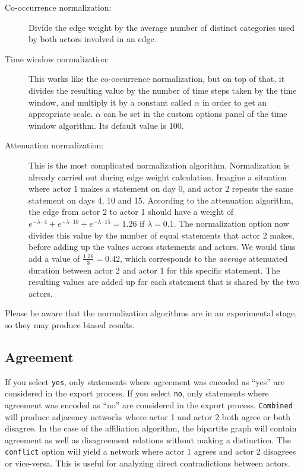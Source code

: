 \documentclass[12pt,a4paper]{scrreprt}
\newcommand{\code}[1]{\texttt{#1}}
\begin{document}
\begin{description}
 \item[Co-occurrence normalization:] Divide the edge weight by the average number of distinct categories used by both actors involved in an edge.
 \item[Time window normalization:] This works like the co-occurrence normalization, but on top of that, it divides the resulting value by the number of time steps taken by the time window, and multiply it by a constant called $\alpha$ in order to get an appropriate scale. $\alpha$ can be set in the custom options panel of the time window algorithm. Its default value is 100.
 \item[Attenuation normalization:] This is the most complicated normalization algorithm. Normalization is already carried out during edge weight calculation. Imagine a situation where actor 1 makes a statement on day 0, and actor 2 repeats the same statement on days 4, 10 and 15. According to the attenuation algorithm, the edge from actor 2 to actor 1 should have a weight of $e^{-\lambda \cdot 4} + e^{-\lambda \cdot 10} + e^{-\lambda \cdot 15} = 1.26$ if $\lambda = 0.1$. The normalization option now divides this value by the number of equal statements that actor 2 makes, before adding up the values across statements and actors. We would thus add a value of $\frac{1.26}{3} = 0.42$, which corresponds to the \emph{average} attenuated duration between actor 2 and actor 1 for this specific statement. The resulting values are added up for each statement that is shared by the two actors.
\end{description}
Please be aware that the normalization algorithms are in an experimental stage, so they may produce biased results.

\subsection{Agreement}\label{agreement}
If you select \code{yes}, only statements where agreement was encoded as ``yes'' are considered in the export process. If you select \code{no}, only statements where agreement was encoded as ``no'' are considered in the export process. \code{Combined} will produce adjacency networks where actor 1 and actor 2 both agree or both disagree. In the case of the affiliation algorithm, the bipartite graph will contain agreement as well as disagreement relations without making a distinction. The \code{conflict} option will yield a network where actor 1 agrees and actor 2 disagrees or vice-versa. This is useful for analyzing direct contradictions between actors.
\end{document}
